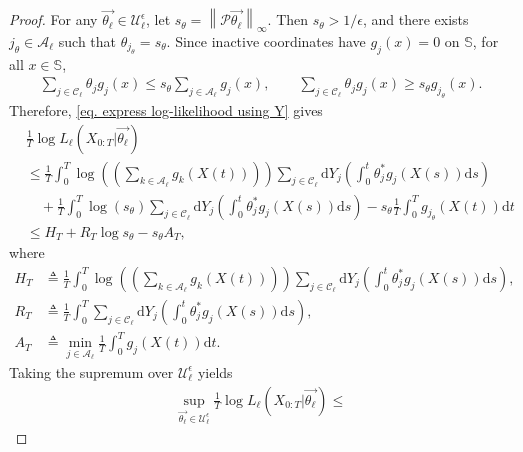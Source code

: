 \documentclass[pdflatex,sn-mathphys-num]{sn-jnl}%
\def\dd{\text{d}}
\theoremstyle{thmstyleone}%
\theoremstyle{thmstyletwo}%
\theoremstyle{thmstylethree}%
\begin{document}
\begin{appendices}
\begin{proof}
    For any $\overrightarrow{\theta_\ell}\in\mathcal U_\ell^\epsilon$, let
    $s_\theta=\left\|\mathcal P\overrightarrow{\theta_\ell}\right\|_\infty$.
    Then $s_\theta>1/\epsilon$, and there exists $j_\theta\in\mathcal A_\ell$ such that $\theta_{j_\theta}=s_\theta$.
    Since inactive coordinates have $g_j(x)=0$ on $\mathbb S$, for all $x\in\mathbb S$,
    \begin{align*}
        \sum_{j\in\mathcal C_\ell}\theta_jg_j(x)
        \leq s_\theta\sum_{j\in\mathcal A_\ell}g_j(x),
        \qquad
        \sum_{j\in\mathcal C_\ell}\theta_jg_j(x)
        \geq s_\theta g_{j_\theta}(x).
    \end{align*}
    Therefore, \eqref{eq. express log-likelihood using Y} gives
    \begin{align*}
        &\frac{1}{T}\log L_\ell\left(X_{0:T}\big|\overrightarrow{\theta_\ell}\right)\\
        &\leq
        \frac{1}{T}\int_0^T
        \log\left(\left(\sum_{k\in\mathcal A_\ell}g_k(X(t))\right)\right)
        \sum_{j\in\mathcal C_\ell}
        \dd Y_j\left(\int_0^t\theta_j^*g_j(X(s))\dd s\right)\\
        &\quad + \frac{1}{T}\int_0^T
        \log\left(s_\theta\right)
        \sum_{j\in\mathcal C_\ell}
        \dd Y_j\left(\int_0^t\theta_j^*g_j(X(s))\dd s\right)
        -s_\theta\frac{1}{T}\int_0^T g_{j_\theta}(X(t))\dd t\\
        &\leq
        H_T
        + R_T\log s_\theta
        -s_\theta A_T,
    \end{align*}
    where
    \begin{align*}
        H_T&\triangleq
        \frac{1}{T}\int_0^T
        \log\left(\left(\sum_{k\in\mathcal A_\ell}g_k(X(t))\right)\right)
        \sum_{j\in\mathcal C_\ell}
        \dd Y_j\left(\int_0^t\theta_j^*g_j(X(s))\dd s\right),\\
        R_T&\triangleq
        \frac{1}{T}\int_0^T
        \sum_{j\in\mathcal C_\ell}
        \dd Y_j\left(\int_0^t\theta_j^*g_j(X(s))\dd s\right),\\
        A_T&\triangleq
        \min_{j\in\mathcal A_\ell}\frac{1}{T}\int_0^T g_j(X(t))\dd t.
    \end{align*}
    Taking the supremum over $\mathcal U_\ell^\epsilon$ yields
    \begin{align*}
        \sup_{\overrightarrow{\theta_\ell}\in\mathcal U_\ell^\epsilon}
        \frac{1}{T}\log L_\ell\left(X_{0:T}\big|\overrightarrow{\theta_\ell}\right)
        \leq

\end{align*}
\end{proof}
\end{appendices}
\end{document}
